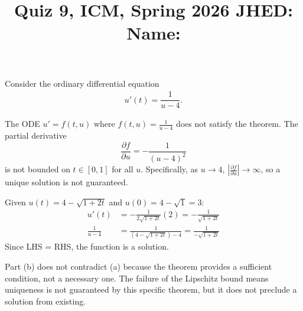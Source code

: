 \documentclass[reqno, answers]{exam}
\title{\normalsize{Quiz 9, ICM, Spring 2026 \hspace{1ex} JHED: \underline{\hspace{20ex}} \hspace{2ex} Name: \underline{\hspace{40ex}}}}
\author{}
\date{}
\begin{document}
\maketitle
\vspace{-2cm} %

\begin{questions}
\question
  Consider the ordinary differential equation
  \begin{align*}
    u'(t) = \dfrac{1}{u - 4}.
  \end{align*}

  \begin{solution}
    The ODE $u' = f(t, u)$ where $f(t, u) = \frac{1}{u-4}$ does not satisfy the theorem. The partial derivative
    $$\frac{\partial f}{\partial u} = -\frac{1}{(u-4)^2}$$
    is not bounded on $t \in [0, 1]$ for all $u$. Specifically, as $u \to 4$, $|\frac{\partial f}{\partial u}| \to \infty$, so a unique solution is not guaranteed.

    Given $u(t) = 4 - \sqrt{1 + 2t}$ and $u(0) = 4 - \sqrt{1} = 3$:
    \begin{align*}
      u'(t)         & = -\frac{1}{2\sqrt{1+2t}}(2) = -\frac{1}{\sqrt{1+2t}}      \\
      \frac{1}{u-4} & = \frac{1}{(4 - \sqrt{1+2t}) - 4} = \frac{1}{-\sqrt{1+2t}}
    \end{align*}
    Since LHS = RHS, the function is a solution.

    Part (b) does not contradict (a) because the theorem provides a sufficient condition, not a necessary one. The failure of the Lipschitz bound means uniqueness is not guaranteed by this specific theorem, but it does not preclude a solution from existing.


\end{solution}
\end{questions}
\end{document}
